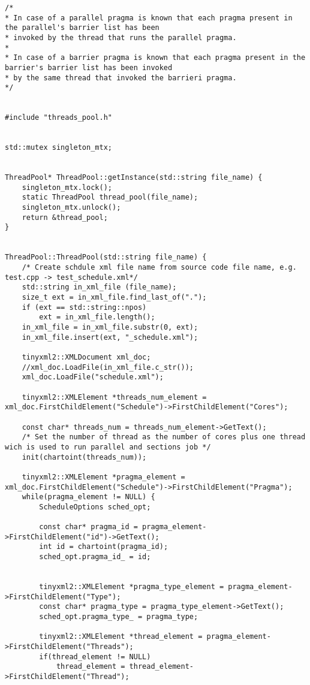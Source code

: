 \documentclass[a4paper,11pt,twoside]{book}
\begin{document}
\begin{lstlisting}[language=CCC, caption=thread\_pool.cpp]
/*
* In case of a parallel pragma is known that each pragma present in the parallel's barrier list has been
* invoked by the thread that runs the parallel pragma.
*
* In case of a barrier pragma is known that each pragma present in the barrier's barrier list has been invoked
* by the same thread that invoked the barrieri pragma.
*/


#include "threads_pool.h"


std::mutex singleton_mtx;


ThreadPool* ThreadPool::getInstance(std::string file_name) {
    singleton_mtx.lock();
    static ThreadPool thread_pool(file_name);
    singleton_mtx.unlock();
    return &thread_pool;
}


ThreadPool::ThreadPool(std::string file_name) {
    /* Create schdule xml file name from source code file name, e.g. test.cpp -> test_schedule.xml*/
    std::string in_xml_file (file_name);
    size_t ext = in_xml_file.find_last_of(".");
    if (ext == std::string::npos)
        ext = in_xml_file.length();
    in_xml_file = in_xml_file.substr(0, ext);
    in_xml_file.insert(ext, "_schedule.xml");

    tinyxml2::XMLDocument xml_doc;
    //xml_doc.LoadFile(in_xml_file.c_str());
    xml_doc.LoadFile("schedule.xml");

    tinyxml2::XMLElement *threads_num_element = xml_doc.FirstChildElement("Schedule")->FirstChildElement("Cores");

    const char* threads_num = threads_num_element->GetText();
    /* Set the number of thread as the number of cores plus one thread wich is used to run parallel and sections job */
    init(chartoint(threads_num));

    tinyxml2::XMLElement *pragma_element = xml_doc.FirstChildElement("Schedule")->FirstChildElement("Pragma");
    while(pragma_element != NULL) {
        ScheduleOptions sched_opt;

        const char* pragma_id = pragma_element->FirstChildElement("id")->GetText();
        int id = chartoint(pragma_id);
        sched_opt.pragma_id_ = id;
        

        tinyxml2::XMLElement *pragma_type_element = pragma_element->FirstChildElement("Type");
        const char* pragma_type = pragma_type_element->GetText();
        sched_opt.pragma_type_ = pragma_type;

        tinyxml2::XMLElement *thread_element = pragma_element->FirstChildElement("Threads");
        if(thread_element != NULL)
            thread_element = thread_element->FirstChildElement("Thread");
        

\end{lstlisting}
\end{document}
